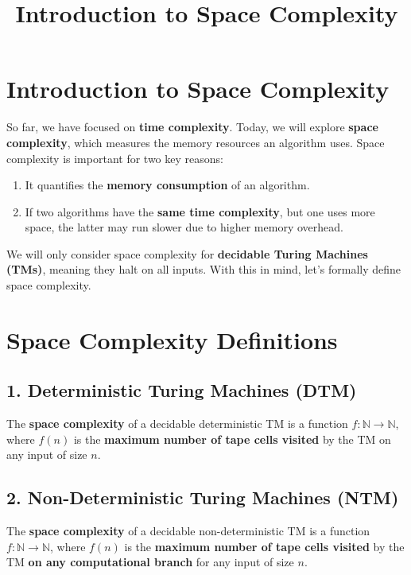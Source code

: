 \documentclass{article}
\title{Introduction to Space Complexity}
\author{}
\date{}
\begin{document}
\maketitle

\section*{Introduction to Space Complexity}

So far, we have focused on \textbf{time complexity}. Today, we will explore \textbf{space complexity}, which measures the memory resources an algorithm uses. Space complexity is important for two key reasons:

\begin{enumerate}
    \item It quantifies the \textbf{memory consumption} of an algorithm.
    \item If two algorithms have the \textbf{same time complexity}, but one uses more space, the latter may run slower due to higher memory overhead.
\end{enumerate}

We will only consider space complexity for \textbf{decidable Turing Machines (TMs)}, meaning they halt on all inputs. With this in mind, let's formally define space complexity.

\section*{Space Complexity Definitions}

\subsection*{1. Deterministic Turing Machines (DTM)}
The \textbf{space complexity} of a decidable deterministic TM is a function \( f: \mathbb{N} \rightarrow \mathbb{N} \), where \( f(n) \) is the \textbf{maximum number of tape cells visited} by the TM on any input of size \( n \).

\subsection*{2. Non-Deterministic Turing Machines (NTM)}
The \textbf{space complexity} of a decidable non-deterministic TM is a function \( f: \mathbb{N} \rightarrow \mathbb{N} \), where \( f(n) \) is the \textbf{maximum number of tape cells visited} by the TM \textbf{on any computational branch} for any input of size \( n \).
\end{document}
